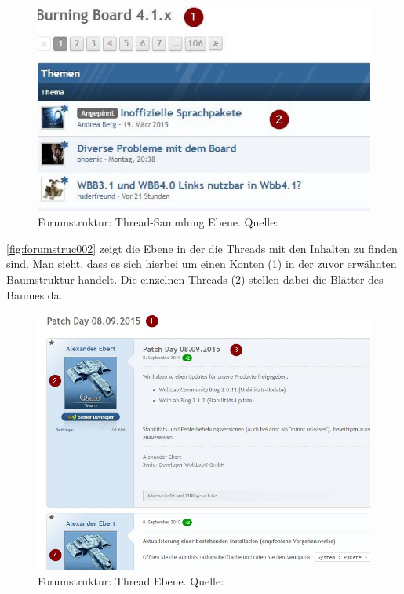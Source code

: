 \documentclass[a4paper]{article}
\begin{document}
	\begin{figure}[H] 
		\centerline{
			\includegraphics{../Bilder/forumstruc002.jpg}
		}
		\caption{Forumstruktur: Thread-Sammlung Ebene. Quelle: \cite{BB}}
		\label{fig:forumstruc002}
	\end{figure}	
	
	\autoref{fig:forumstruc002} zeigt die Ebene in der die Threads mit den
	Inhalten zu finden sind. Man sieht, dass es sich hierbei um einen Konten (1)
	in der zuvor erwähnten Baumstruktur handelt. Die einzelnen Threads (2) stellen
	dabei die Blätter des Baumes da.
		
	\begin{figure}[H] 
		\centerline{
			\includegraphics[scale=0.6]{../Bilder/forumstruc003.jpg}
		}
		\caption{Forumstruktur: Thread Ebene. Quelle: \cite{BB}}
		\label{fig:forumstruc003}
	\end{figure}	
	
\end{document}

